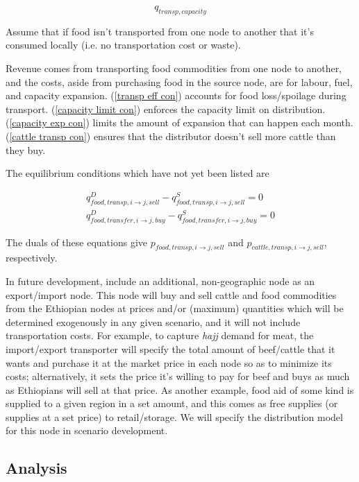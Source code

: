\documentclass[letter,12pt]{article}
\begin{document}
\begin{equation}
q_{transp,capacity}
\end{equation}

Assume that if food isn't transported from one node to another that it's consumed locally (i.e. no transportation cost or waste).

Revenue comes from transporting food commodities from one node to another, and the costs, aside from purchasing food in the source node, are for labour, fuel, and capacity expansion. (\ref{transp eff con}) accounts for food loss/spoilage during transport.  (\ref{capacity limit con}) enforces the capacity limit on distribution.  (\ref{capacity exp con}) limits the amount of expansion that can happen each month.  (\ref{cattle transp con}) ensures that the distributor doesn't sell more cattle than they buy.

The equilibrium conditions which have not yet been listed are

\begin{align}
q_{food,transp,i \rightarrow j,sell}^D - q_{food,transp,i \rightarrow j,sell}^S = 0 \\
q_{food,transfer,i \rightarrow j,buy}^D - q_{food,transfer,i \rightarrow j,buy}^S = 0
\end{align}

The duals of these equations give $p_{food,transp,i \rightarrow j,sell}$ and $p_{cattle,transp,i \rightarrow j,sell}$, respectively.

In future development, include an additional, non-geographic node as an export/import node.  This node will buy and sell cattle and food commodities from the Ethiopian nodes at prices and/or (maximum) quantities which will be determined exogenously in any given scenario, and it will not include transportation costs.  For example, to capture \textit{hajj} demand for meat, the import/export transporter will specify the total amount of beef/cattle that it wants and purchase it at the market price in each node so as to minimize its costs; alternatively, it sets the price it's willing to pay for beef and buys as much as Ethiopians will sell at that price.  As another example, food aid of some kind is supplied to a given region in a set amount, and this comes as free supplies (or supplies at a set price) to retail/storage.  We will specify the distribution model for this node in scenario development.


\subsection{Analysis}
\end{document}
